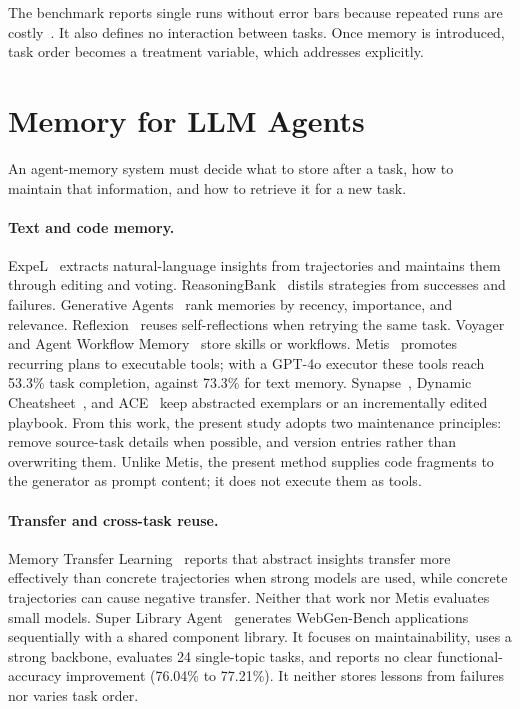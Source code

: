 The benchmark reports single runs without error bars because repeated runs are costly~\cite{lu2025webgenbench}. It also defines no interaction between tasks. Once memory is introduced, task order becomes a treatment variable, which  addresses explicitly.

\section{Memory for LLM Agents}
\label{sec:bg-memory}
An agent-memory system must decide what to store after a task, how to maintain that information, and how to retrieve it for a new task.

\paragraph{Text and code memory.} ExpeL~\cite{zhao2024expel} extracts natural-language insights from trajectories and maintains them through editing and voting. ReasoningBank~\cite{reasoningbank2025} distils strategies from successes and failures. Generative Agents~\cite{park2023generative} rank memories by recency, importance, and relevance. Reflexion~\cite{shinn2023reflexion} reuses self-reflections when retrying the same task. Voyager~\cite{wang2023voyager} and Agent Workflow Memory~\cite{wang2025awm} store skills or workflows. Metis~\cite{dai2026metis} promotes recurring plans to executable tools; with a GPT-4o executor these tools reach 53.3\% task completion, against 73.3\% for text memory. Synapse~\cite{zheng2024synapse}, Dynamic Cheatsheet~\cite{suzgun2026cheatsheet}, and ACE~\cite{ace2026} keep abstracted exemplars or an incrementally edited playbook. From this work, the present study adopts two maintenance principles: remove source-task details when possible, and version entries rather than overwriting them. Unlike Metis, the present method supplies code fragments to the generator as prompt content; it does not execute them as tools.

\paragraph{Transfer and cross-task reuse.} Memory Transfer Learning~\cite{kim2026mtl} reports that abstract insights transfer more effectively than concrete trajectories when strong models are used, while concrete trajectories can cause negative transfer. Neither that work nor Metis evaluates small models. Super Library Agent~\cite{sung2026superlibrary} generates WebGen-Bench applications sequentially with a shared component library. It focuses on maintainability, uses a strong backbone, evaluates 24 single-topic tasks, and reports no clear functional-accuracy improvement (76.04\% to 77.21\%). It neither stores lessons from failures nor varies task order.

